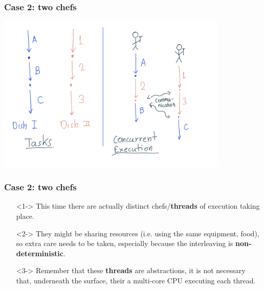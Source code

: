 \documentclass[xcolor={dvipsnames,svgnames},aspectratio=169]{beamer}
\begin{document}
\begin{frame}[fragile]
  \frametitle{Case 2: two chefs}

  \begin{center}
    \includegraphics[width=11cm,keepaspectratio]{media/lecture1-twochefs.png}
  \end{center}

\end{frame}

\begin{frame}[fragile]
  \frametitle{Case 2: two chefs}

  \large{
    \begin{itemize}
    \item[\faBook]<1-> This time there are actually distinct chefs/\textbf{threads} of
      execution taking place.
    \item[\faBook]<2-> They might be sharing resources (i.e. using the same
      equipment, food), so extra care needs to be taken, especially because the
      interleaving is \textbf{non-deterministic}.
    \item[\faBook]<3-> Remember that these \textbf{threads} are abstractions, it
      is not necessary that, underneath the surface, their a multi-core CPU
      executing each thread.
    \end{itemize}}
\end{frame}
\end{document}
